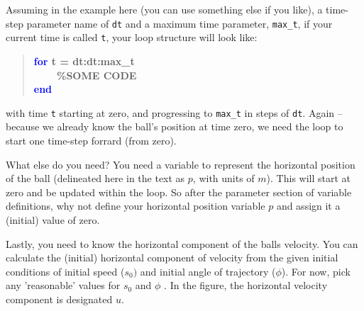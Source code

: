 \documentclass{tufte-book} %
\newenvironment{docspecbold}{\begin{quotation}\ttfamily\bfseries\parskip0pt\parindent0pt\ignorespaces}{\end{quotation}}
\begin{document}
Assuming in the example here (you can use something else if you like), a time-step parameter name of \texttt{dt} and a maximum time parameter, \texttt{max\_t}, if your current time is called \texttt{t}, your loop structure will look like:
\begin{docspecbold}
\textcolor{blue}{for} t = dt:dt:max\_t
\\ \ \ \ \ \textcolor[rgb]{0,0.501961,0}{\%SOME CODE}
\\\textcolor{blue}{end}
\end{docspecbold}
with time \texttt{t} starting at zero, and progressing to \texttt{max\_t} in steps of \texttt{dt}. Again -- because we already know the ball's position at time zero, we need the loop to start one time-step forrard (from zero).

What else do you need? You need a variable to represent the horizontal position of the ball (delineated here in the text as \(p\), with units of \(m\)). This will start at zero and be updated within the loop. So after the parameter section of variable definitions, why not define your horizontal position variable \(p\) and assign it a (initial) value of zero.

Lastly, you need to know the horizontal component of the balls velocity.  You can calculate the (initial) horizontal component of velocity from the given initial conditions of initial speed (\(s_{0})\) and initial angle of trajectory (\(\phi\)). For now, pick any 'reasonable' values for \(s_{0}\)  and \(\phi\) . In the figure, the horizontal velocity component is designated \(u\).
\end{document}
